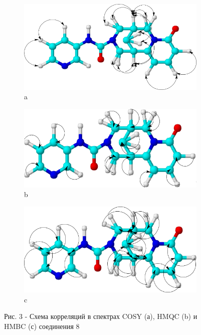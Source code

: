 \begin{figure}[H]
    \centering
    \begin{subfigure}[b]{0.32\textwidth}
        \centering
        \includegraphics[width=\textwidth]{assets/11}
        \caption*{a}
    \end{subfigure}
    \hfill
    \begin{subfigure}[b]{0.32\textwidth}
        \centering
        \includegraphics[width=\textwidth]{assets/12}
        \caption*{b}
    \end{subfigure}
    \hfill
    \begin{subfigure}[b]{0.32\textwidth}
        \centering
        \includegraphics[width=\textwidth]{assets/13}
        \caption*{c}
    \end{subfigure}
    
    \caption*{Рис. 3 - Схема корреляций в спектрах COSY (а), HMQC (b) и HMBC (с) соединения 8}
\end{figure}


